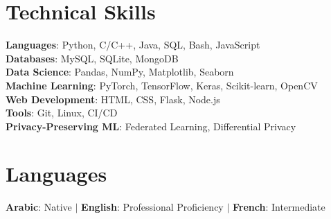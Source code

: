 \documentclass[letterpaper,11pt]{article}
\begin{document}
\section{Technical Skills}
  \textbf{Languages}{: Python, C/C++, Java, SQL, Bash, JavaScript}\\[3pt]
  \textbf{Databases}{: MySQL, SQLite, MongoDB}\\[3pt]
  \textbf{Data Science}{: Pandas, NumPy, Matplotlib, Seaborn}\\[3pt]
  \textbf{Machine Learning}{: PyTorch, TensorFlow, Keras, Scikit-learn, OpenCV}\\[3pt]
  \textbf{Web Development}{: HTML, CSS, Flask, Node.js}\\[3pt]
  \textbf{Tools}{: Git, Linux, CI/CD}\\[3pt]
  \textbf{Privacy-Preserving ML}{: Federated Learning, Differential Privacy}
 
\section{Languages}
    \textbf{Arabic}{: Native} \hspace{2pt} $|$ \hspace{2pt} \textbf{English}{: Professional Proficiency} \hspace{2pt} $|$ \hspace{2pt} \textbf{French}{: Intermediate}
\end{document}
